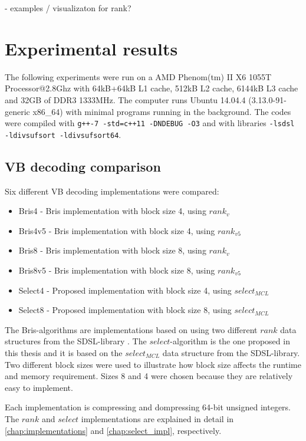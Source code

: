  - examples / visualizaton for rank?


\chapter{Experimental results}

The following experiments were run on a AMD Phenom(tm) II X6 1055T Processor@2.8Ghz with 64kB+64kB L1 cache, 512kB L2 cache, 6144kB L3 cache and 32GB of DDR3 1333MHz.
The computer runs Ubuntu 14.04.4 (3.13.0-91-generic x86\_64) with minimal programs running in the background. The codes were compiled with \texttt{g++-7 -std=c++11 -DNDEBUG -O3} 
and with libraries \texttt{-lsdsl -ldivsufsort -ldivsufsort64}.


\section{VB decoding comparison}
Six different VB decoding implementations were compared:
\begin{itemize}
  \item Bris4 - Bris implementation with block size 4, using $rank_v$
  \item Bris4v5 - Bris implementation with block size 4, using $rank_{v5}$
  \item Bris8 - Bris implementation with block size 8, using $rank_v$
  \item Bris8v5 - Bris implementation with block size 8, using $rank_{v5}$
  \item Select4 - Proposed implementation with block size 4, using $select_{MCL}$
  \item Select8 - Proposed implementation with block size 8, using $select_{MCL}$
\end{itemize}

The Bris-algorithms are implementations based on \citep{Bri09} using two different $rank$ data structures from the SDSL-library \citep{gbmp2014sea}. The $select$-algorithm is the one proposed in 
this thesis and it is based on the $select_{MCL}$ data structure from the SDSL-library. Two different block sizes were used to illustrate how block size affects the runtime and memory requirement. Sizes 
8 and 4 were chosen because they are relatively easy to implement. 

Each implementation is compressing and dompressing 64-bit unsigned integers. The $rank$ and $select$ implementations are explained in detail in \autoref{chap:implementations} 
and \autoref{chap:select_impl}, respectively.

